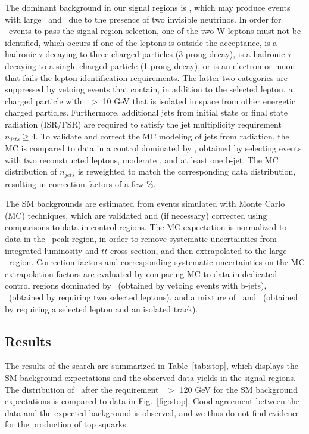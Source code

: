 The dominant background in our signal regions is \ttll, which may produce events with large \met\ and \mt\ due to the presence of
two invisible neutrinos. In order for \ttll\ events to pass the signal region selection, one of the two W leptons must not be identified,
which occurs if one of the leptons is outside the acceptance, is a hadronic $\tau$ decaying to three charged particles (3-prong decay),
is a hadronic $\tau$ decaying to a single charged particle (1-prong decay), or is an electron or muon that fails the lepton identification
requirements. The latter two categories are suppressed by vetoing events that contain, in addition to the selected lepton, a charged particle
with \pt\ $>$ 10 GeV that is isolated in space from other energetic charged particles. Furthermore, additional jets from initial state or
final state radiation (ISR/FSR) are required to satisfy the jet multiplicity requirement $n_{jets}\geq4$. To validate and correct the MC modeling
of jets from radiation, the MC is compared to data in a control dominated by \ttll, obtained by selecting events with two reconstructed leptons, 
moderate \met, and at least one b-jet. The MC distribution of $n_{jets}$ is reweighted to match the corresponding data distribution, resulting
in correction factors of a few \%.

The SM backgrounds are estimated from events simulated with Monte Carlo (MC) techniques, which are validated and 
(if necessary) corrected using comparisons to data in control regions. The MC expectation is normalized to data in the \mt\ peak region,
in order to remove systematic uncertainties from integrated luminosity and $t\bar{t}$ cross section, and then extrapolated to the large \mt\ region.
Correction factors and corresponding systematic uncertainties on the MC extrapolation factors are evaluated by comparing MC to data in dedicated
control regions dominated by \wjets\ (obtained by vetoing events with b-jets), \ttll\ (obtained by requiring two selected leptons),
and a mixture of \ttll\ and \ttljets\ (obtained by requiring a selected lepton and an isolated track).



\subsection{Results}

The results of the search are summarized in Table~\ref{tab:stop}, which displays the SM background expectations and the observed data yields
in the signal regions. The distribution of \met\ after the requirement \mt\ $>$ 120 GeV for the SM background expectations is compared to
data in Fig.~\ref{fig:stop}. Good agreement between the data and the expected background is observed, and we thus do not find evidence
for the production of top squarks.

